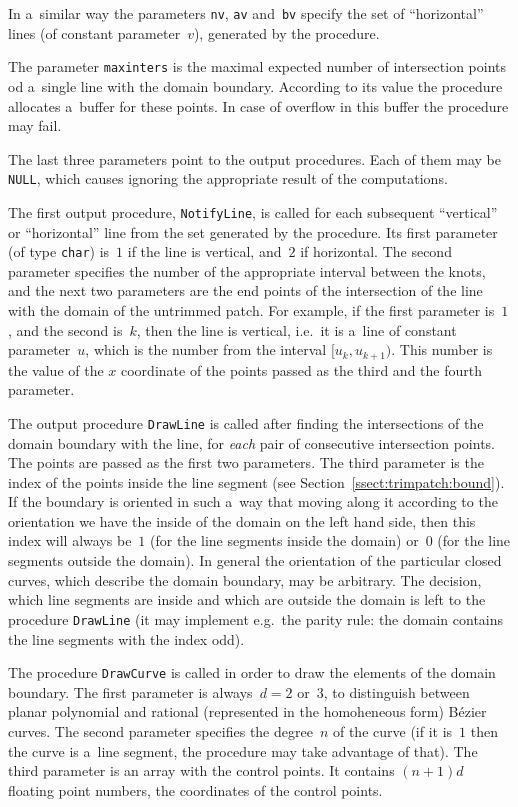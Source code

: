 In a~similar way the parameters \texttt{nv}, \texttt{av} and~\texttt{bv}
specify the set of ``horizontal'' lines (of constant parameter~$v$),
generated by the procedure.

The parameter \texttt{maxinters} is the maximal expected number of intersection
points od a~single line with the domain boundary. According to its value
the procedure allocates a~buffer for these points. In case of overflow in
this buffer the procedure may fail.

The last three parameters point to the output procedures.
Each of them may be \texttt{NULL}, which causes ignoring the appropriate
result of the computations.

The first output procedure, \texttt{NotifyLine}, is called for each
subsequent ``vertical'' or ``horizontal'' line from the set generated
by the procedure. Its first parameter (of type \texttt{char}) is~$1$
if the line is vertical, and~$2$ if horizontal.
The second parameter specifies the number of the appropriate interval
between the knots, and the next two parameters are the end points of the
intersection of the line with the domain of the untrimmed patch.
For example, if the first parameter is~$1$, and the second is~$k$,
then the line is vertical, i.e.\ it is a~line of constant parameter~$u$,
which is the number from the interval $[u_k,u_{k+1})$.
This number is the value of the $x$ coordinate of the points passed
as the third and the fourth parameter.

The output procedure \texttt{DrawLine} is called after finding the
intersections of the domain boundary with the line, for \emph{each} pair
of consecutive intersection points. The points are passed as the first two
parameters. The third parameter is the index of the points inside the line
segment (see Section~\ref{ssect:trimpatch:bound}). If the boundary
is oriented in such a~way that moving along it according to the orientation
we have the inside of the domain on the left hand side, then this index
will always be~$1$ (for the line segments inside the domain) or~$0$
(for the line segments outside the domain). In general the orientation
of the particular closed curves, which describe the domain boundary,
may be arbitrary. The decision, which line segments are inside
and which are outside the domain is left to the procedure
\texttt{DrawLine} (it may implement e.g.\ the parity rule:
the domain contains the line segments with the index odd).

The procedure \texttt{DrawCurve} is called in order to draw the
elements of the domain boundary. The first parameter is always~$d=2$
or~$3$, to distinguish between planar polynomial and rational (represented
in the homoheneous form) B\'{e}zier curves. The second parameter specifies
the degree~$n$ of the curve (if it is~$1$ then the curve is a~line segment,
the procedure may take advantage of that). The third parameter
is an array with the control points. It contains $(n+1)d$ floating point
numbers, the coordinates of the control points.



